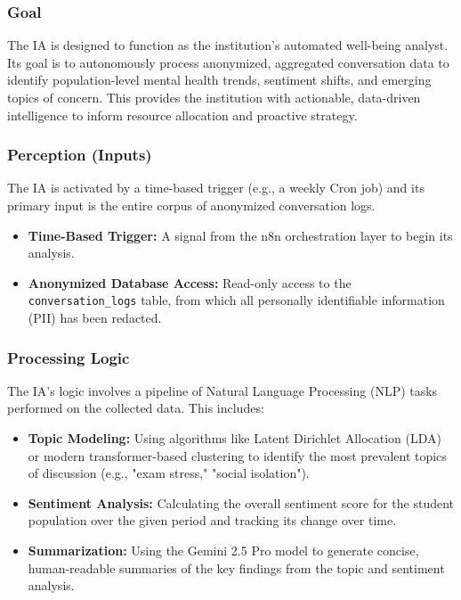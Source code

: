 \subsubsection{Goal}
The IA is designed to function as the institution's automated well-being analyst. Its goal is to autonomously process anonymized, aggregated conversation data to identify population-level mental health trends, sentiment shifts, and emerging topics of concern. This provides the institution with actionable, data-driven intelligence to inform resource allocation and proactive strategy.

\subsubsection{Perception (Inputs)}
The IA is activated by a time-based trigger (e.g., a weekly Cron job) and its primary input is the entire corpus of anonymized conversation logs.
\begin{itemize}
    \item \textbf{Time-Based Trigger:} A signal from the n8n orchestration layer to begin its analysis.
    \item \textbf{Anonymized Database Access:} Read-only access to the \texttt{conversation\_logs} table, from which all personally identifiable information (PII) has been redacted.
\end{itemize}

\subsubsection{Processing Logic}
The IA's logic involves a pipeline of Natural Language Processing (NLP) tasks performed on the collected data. This includes:
\begin{itemize}
    \item \textbf{Topic Modeling:} Using algorithms like Latent Dirichlet Allocation (LDA) or modern transformer-based clustering to identify the most prevalent topics of discussion (e.g., "exam stress," "social isolation").
    \item \textbf{Sentiment Analysis:} Calculating the overall sentiment score for the student population over the given period and tracking its change over time.
    \item \textbf{Summarization:} Using the Gemini 2.5 Pro model to generate concise, human-readable summaries of the key findings from the topic and sentiment analysis.
\end{itemize}

